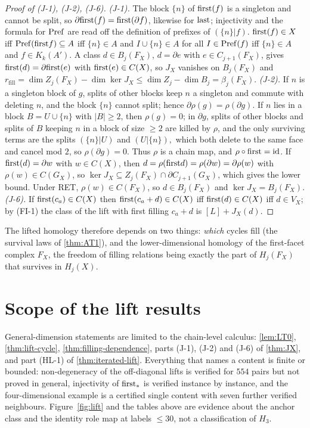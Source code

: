 \begin{proof}[Proof of (J-1), (J-2), (J-6)]
\emph{(J-1).} The block $\{n\}$ of $\mathrm{first}(f)$ is a singleton and cannot be split, so $\partial\mathrm{first}(f)=\mathrm{first}(\partial f)$, likewise for $\mathrm{last}$; injectivity and the formula for $\mathrm{Pref}$ are read off the definition of prefixes of $(\{n\}|f)$. $\mathrm{first}(f)\in X$ iff $\mathrm{Pref}(\mathrm{first} f)\subseteq A$ iff $\{n\}\in A$ and $I\cup\{n\}\in A$ for all $I\in\mathrm{Pref}(f)$ iff $\{n\}\in A$ and $f\in K_k(A')$. A class $d\in B_j(F_X)$, $d=\partial e$ with $e\in C_{j+1}(F_X)$, gives $\mathrm{first}(d)=\partial\mathrm{first}(e)$ with $\mathrm{first}(e)\in C(X)$, so $J_X$ vanishes on $B_j(F_X)$ and $r_{\mathrm{fill}}=\dim Z_j(F_X)-\dim\ker J_X\le\dim Z_j-\dim B_j=\beta_j(F_X)$.
\emph{(J-2).} If $n$ is a singleton block of $g$, splits of other blocks keep $n$ a singleton and commute with deleting $n$, and the block $\{n\}$ cannot split; hence $\partial\rho(g)=\rho(\partial g)$. If $n$ lies in a block $B=U\cup\{n\}$ with $|B|\ge2$, then $\rho(g)=0$; in $\partial g$, splits of other blocks and splits of $B$ keeping $n$ in a block of size $\ge2$ are killed by $\rho$, and the only surviving terms are the splits $(\{n\}|U)$ and $(U|\{n\}),$ which both delete to the same face and cancel mod $2$, so $\rho(\partial g)=0$. Thus $\rho$ is a chain map, and $\rho\circ\mathrm{first}=\mathrm{id}$. If $\mathrm{first}(d)=\partial w$ with $w\in C(X)$, then $d=\rho(\mathrm{first} d)=\rho(\partial w)=\partial\rho(w)$ with $\rho(w)\in C(G_X)$, so $\ker J_X\subseteq Z_j(F_X)\cap\partial C_{j+1}(G_X)$, which gives the lower bound. Under RET, $\rho(w)\in C(F_X)$, so $d\in B_j(F_X)$ and $\ker J_X=B_j(F_X)$.
\emph{(J-6).} If $\mathrm{first}(c_a)\in C(X)$ then $\mathrm{first}(c_a+d)\in C(X)$ iff $\mathrm{first}(d)\in C(X)$ iff $d\in V_X$; by (FI-1) the class of the lift with first filling $c_a+d$ is $[L]+J_X(d)$.
\end{proof}
The lifted homology therefore depends on two things: \emph{which} cycles fill (the survival laws of \cref{thm:AT1}), and the lower-dimensional homology of the first-facet complex $F_X$, the freedom of filling relations being exactly the part of $H_j(F_X)$ that survives in $H_j(X)$.

\section{Scope of the lift results}
General-dimension statements are limited to the chain-level calculus: \cref{lem:LT0}, \cref{thm:lift-cycle}, \cref{thm:filling-dependence}, parts (J-1), (J-2) and (J-6) of \cref{thm:JX}, and part (HL-1) of \cref{thm:iterated-lift}. Everything that names a content is finite or bounded: non-degeneracy of the off-diagonal lifts is verified for $554$ pairs but not proved in general, injectivity of $\mathrm{first}_\ast$ is verified instance by instance, and the four-dimensional example is a certified single content with seven further verified neighbours. Figure~\ref{fig:lift} and the tables above are evidence about the anchor class and the identity role map at labels $\le30$, not a classification of $H_3$.
